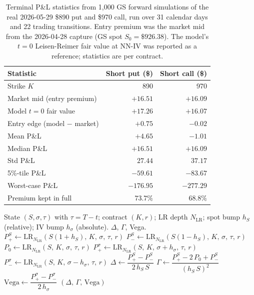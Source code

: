 \begin{table}[ht]
\centering
\caption{Terminal P\&L statistics from 1{,}000 GS forward simulations of the real 2026-05-29 \$890 put and \$970 call, run over 31 calendar days and 22 trading transitions. Entry premium was the market mid from the 2026-04-28 capture (GS spot $S_0 = \$926.38$). The model's $t=0$ Leisen-Reimer fair value at NN-IV was reported as a reference; statistics are per contract.}
\label{tab:gs_scenario}
\begin{tabular}{lrr}
\toprule
Statistic & Short put (\$) & Short call (\$) \\
\midrule
Strike $K$                  & 890        & 970       \\
Market mid (entry premium)  & $+16.51$   & $+16.09$  \\
Model $t=0$ fair value      & $+17.26$   & $+16.07$  \\
Entry edge (model $-$ market) & $+0.75$  & $-0.02$   \\
\midrule
Mean P\&L                    &  $+4.65$  &  $-1.01$  \\
Median P\&L                  & $+16.51$  & $+16.09$  \\
Std P\&L                     &  $27.44$  &  $37.17$  \\
5\%-tile P\&L                & $-59.61$  & $-83.67$  \\
Worst-case P\&L              & $-176.95$ & $-277.29$ \\
Premium kept in full         & $73.7\%$  & $68.8\%$  \\
\bottomrule
\end{tabular}
\end{table}

\begin{algorithm}[ht]
\caption{Path-conditional Greeks via central finite differences on the LR pricer}\label{alg:greeks}
\begin{algorithmic}[1]
\Require State $(S, \sigma, \tau)$ with $\tau = T - t$; contract $(K, r)$; LR depth $N_{\mathrm{LR}}$; spot bump $h_S$ (relative); IV bump $h_\sigma$ (absolute).
\Ensure $\Delta$, $\Gamma$, Vega.
\State $P_+^S \gets \mathrm{LR}_{N_{\mathrm{LR}}}(S(1+h_S),\, K,\, \sigma,\, \tau,\, r)$
\State $P_-^S \gets \mathrm{LR}_{N_{\mathrm{LR}}}(S(1-h_S),\, K,\, \sigma,\, \tau,\, r)$
\State $P_0  \gets \mathrm{LR}_{N_{\mathrm{LR}}}(S,\, K,\, \sigma,\, \tau,\, r)$
\State $P_+^\sigma \gets \mathrm{LR}_{N_{\mathrm{LR}}}(S,\, K,\, \sigma + h_\sigma,\, \tau,\, r)$
\State $P_-^\sigma \gets \mathrm{LR}_{N_{\mathrm{LR}}}(S,\, K,\, \sigma - h_\sigma,\, \tau,\, r)$
\State $\Delta \gets \dfrac{P_+^S - P_-^S}{2\, h_S\, S}$
\State $\Gamma \gets \dfrac{P_+^S - 2\, P_0 + P_-^S}{(h_S\, S)^2}$
\State $\mathrm{Vega} \gets \dfrac{P_+^\sigma - P_-^\sigma}{2\, h_\sigma}$ 
\State \Return $(\Delta,\, \Gamma,\, \mathrm{Vega})$
\end{algorithmic}
\end{algorithm}

